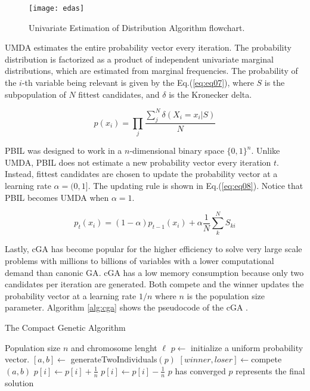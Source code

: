 \begin{figure}[ht]
	\centering
		\texttt{[image: edas]}
	\caption{Univariate Estimation of Distribution Algorithm flowchart.}
	\label{fig:im04}
\end{figure}

UMDA estimates the entire probability vector every iteration.  The probability distribution is factorized as a product of independent univariate marginal distributions, which are estimated from marginal frequencies.  The probability of the \(i\)-th variable being relevant is given by the Eq.(\ref{eq:eq07}), where \(S\) is the subpopulation of \(N\) fittest candidates, and \(\delta\) is the Kronecker delta.

\begin{equation}
	p(x_i)= \prod_{j} \frac {\sum_{j}^{N} \delta(X_i=x_i|S)} {N}
\label{eq:eq07}
\end{equation}

PBIL was designed to work in a \(n\)-dimensional binary space \(\{0,1\}^n\).  Unlike UMDA, PBIL does not estimate a new probability vector every iteration \(t\). Instead, fittest candidates are chosen to update the probability vector at a learning rate \(\alpha=(0,1]\). The updating rule is shown in Eq.(\ref{eq:eq08}). Notice that PBIL becomes UMDA when \(\alpha=1\). 

\begin{equation}
	p_{t}(x_i)= (1-\alpha)p_{t-1}(x_i)+\alpha \frac{1}{N} \sum_{k}^{N} S_{ki} 
\label{eq:eq08}
\end{equation}


Lastly, cGA has become popular for the higher efficiency to solve very large scale problems with millions to billions of variables with a lower computational demand than canonic GA\cite{goldberg07}.  cGA has a low memory consumption because only two candidates per iteration are generated.  Both compete and the winner updates the probability vector at a learning rate \(1/n\) where \(n\) is the population size parameter. 
Algorithm \ref{alg:cga} shows the pseudocode of the cGA .

\begin{algorithm}[ht]
	\caption{\textsf{The Compact Genetic Algorithm}} 
	\begin{algorithmic}
		\REQUIRE Population size $n$ and chromosome lenght $\ell$
		\STATE $p \gets$ initialize a uniform probability vector.
		\REPEAT
			\STATE $[a,b] \gets$ generateTwoIndividuals$(p)$
			\STATE $[winner, loser] \gets $compete$(a,b)$
						\STATE $p[i] \gets p[i] + \frac{1}{n}$
					\ELSE
						\STATE $p[i] \gets p[i] - \frac{1}{n}$
					\ENDIF
				\ENDIF
			\ENDFOR
	\UNTIL $p$ has converged
	\ENSURE $p$ represents the final solution
	\end{algorithmic}
	\label{alg:cga}
\end{algorithm}
